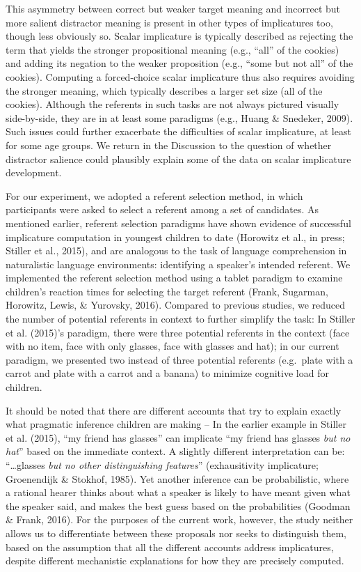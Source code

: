 \documentclass[man]{apa6}
\theoremstyle{definition}
\theoremstyle{definition}
\theoremstyle{definition}
\theoremstyle{remark}
\begin{document}
This asymmetry between correct but weaker target meaning and incorrect
but more salient distractor meaning is present in other types of
implicatures too, though less obviously so. Scalar implicature is
typically described as rejecting the term that yields the stronger
propositional meaning (e.g., \enquote{all} of the cookies) and adding
its negation to the weaker proposition (e.g., \enquote{some but not all}
of the cookies). Computing a forced-choice scalar implicature thus also
requires avoiding the stronger meaning, which typically describes a
larger set size (all of the cookies). Although the referents in such
tasks are not always pictured visually side-by-side, they are in at
least some paradigms (e.g., Huang \& Snedeker, 2009). Such issues could
further exacerbate the difficulties of scalar implicature, at least for
some age groups. We return in the Discussion to the question of whether
distractor salience could plausibly explain some of the data on scalar
implicature development.

For our experiment, we adopted a referent selection method, in which
participants were asked to select a referent among a set of candidates.
As mentioned earlier, referent selection paradigms have shown evidence
of successful implicature computation in youngest children to date
(Horowitz et al., in press; Stiller et al., 2015), and are analogous to
the task of language comprehension in naturalistic language
environments: identifying a speaker's intended referent. We implemented
the referent selection method using a tablet paradigm to examine
children's reaction times for selecting the target referent (Frank,
Sugarman, Horowitz, Lewis, \& Yurovsky, 2016). Compared to previous
studies, we reduced the number of potential referents in context to
further simplify the task: In Stiller et al. (2015)'s paradigm, there
were three potential referents in the context (face with no item, face
with only glasses, face with glasses and hat); in our current paradigm,
we presented two instead of three potential referents (e.g.~plate with a
carrot and plate with a carrot and a banana) to minimize cognitive load
for children.

It should be noted that there are different accounts that try to explain
exactly what pragmatic inference children are making -- In the earlier
example in Stiller et al. (2015), \enquote{my friend has glasses} can
implicate \enquote{my friend has glasses \emph{but no hat}} based on the
immediate context. A slightly different interpretation can be:
\enquote{\ldots{}glasses \emph{but no other distinguishing features}}
(exhausitivity implicature; Groenendijk \& Stokhof, 1985). Yet another
inference can be probabilistic, where a rational hearer thinks about
what a speaker is likely to have meant given what the speaker said, and
makes the best guess based on the probabilities (Goodman \& Frank,
2016). For the purposes of the current work, however, the study neither
allows us to differentiate between these proposals nor seeks to
distinguish them, based on the assumption that all the different
accounts address implicatures, despite different mechanistic
explanations for how they are precisely computed.
\end{document}

